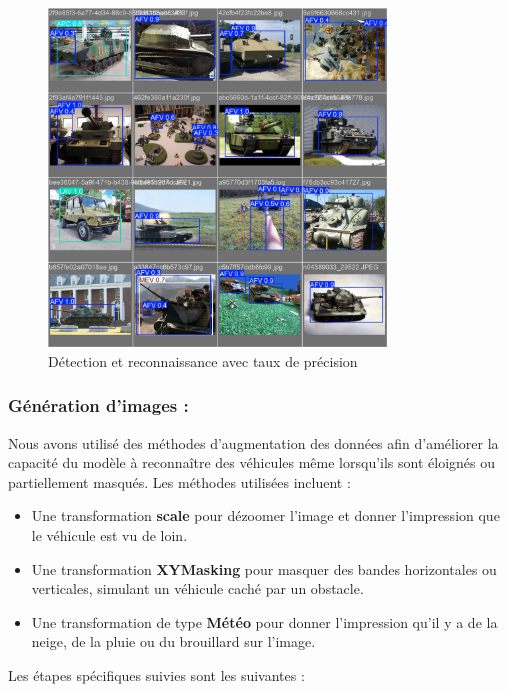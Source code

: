 \begin{figure}[h]
	\center
	\includegraphics[width=0.8\textwidth]{./images/track2_val.jpg}
	\caption[Détection et reconnaissance avec taux de précision]{Détection et reconnaissance avec taux de précision}\label{fig:track2_val}
\end{figure}


\subsubsection{Génération d'images :}

Nous avons utilisé des méthodes d'augmentation des données afin d'améliorer la capacité du modèle à reconnaître des véhicules même lorsqu'ils sont éloignés ou partiellement masqués. Les méthodes utilisées incluent :

\begin{itemize}
	\item Une transformation \textbf{scale} pour dézoomer l'image et donner l'impression que le véhicule est vu de loin.
	\item Une transformation \textbf{XYMasking} pour masquer des bandes horizontales ou verticales, simulant un véhicule caché par un obstacle.
	\item Une transformation de type \textbf{Météo} pour donner l'impression qu'il y a de la neige, de la pluie ou du brouillard sur l'image.
\end{itemize}

\noindent Les étapes spécifiques suivies sont les suivantes :


